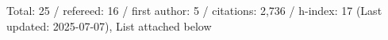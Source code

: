 Total: 25 / refereed: 16 / first author: 5 / citations: 2,736 / h-index: 17 (Last updated: 2025-07-07), List attached below